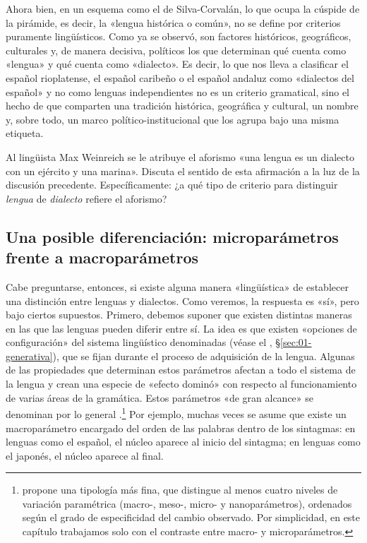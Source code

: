 
Ahora bien, en un esquema como el de Silva-Corvalán, lo que ocupa la cúspide de
la pirámide, es decir, la «lengua histórica o común», no se define por criterios
puramente lingüísticos. Como ya se observó, son factores históricos,
geográficos, culturales y, de manera decisiva, políticos los que determinan qué
cuenta como «lengua» y qué cuenta como «dialecto». Es decir, lo que nos lleva a
clasificar el español rioplatense, el español caribeño o el español andaluz como
«dialectos del español» y no como lenguas independientes no es un criterio
gramatical, sino el hecho de que comparten una tradición histórica, geográfica y
cultural, un nombre y, sobre todo, un marco político-institucional que los
agrupa bajo una misma etiqueta.

\begin{ejercicio}\label{ej:15-weinreich}
Al lingüista Max Weinreich se le atribuye el aforismo «una lengua es un dialecto
con un ejército y una marina». Discuta el sentido de esta afirmación a la luz de
la discusión precedente. Específicamente: ¿a qué tipo de criterio para
distinguir \textit{lengua} de \textit{dialecto} refiere el aforismo?
\end{ejercicio}

\subsection{Una posible diferenciación: microparámetros frente a macroparámetros}\label{sec:15-parametros}

Cabe preguntarse, entonces, si existe alguna manera «lingüística» de establecer
una distinción entre lenguas y dialectos. Como veremos, la respuesta es «sí»,
pero bajo ciertos supuestos. Primero, debemos suponer que existen distintas
maneras en las que las lenguas pueden diferir entre sí. La idea es que existen
«opciones de configuración» del sistema lingüístico denominadas
 (véase el , §\ref{sec:01-generativa}), que se
fijan durante el proceso de adquisición de la lengua. Algunas de las propiedades
que determinan estos parámetros afectan a todo el sistema de la lengua y crean
una especie de «efecto dominó» con respecto al funcionamiento de varias áreas de
la gramática. Estos parámetros «de gran alcance» se denominan por lo general
.\footnote{\textcite{roberts2019} propone una tipología
más fina, que distingue al menos cuatro niveles de variación paramétrica (macro-,
meso-, micro- y nanoparámetros), ordenados según el grado de especificidad del
cambio observado. Por simplicidad, en este capítulo trabajamos solo con el
contraste entre macro- y microparámetros.} Por ejemplo, muchas veces se asume
que existe un macroparámetro encargado del orden de las palabras dentro de los
sintagmas: en lenguas como el español, el núcleo aparece al inicio del sintagma;
en lenguas como el japonés, el núcleo aparece al final.

